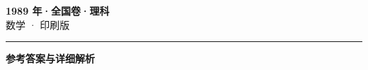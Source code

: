 \documentclass[zihao=5, a4paper]{ctexart}
\begin{document}
\begin{center}
  {\Large\bfseries 1989 年·全国卷·理科}\\[4pt]
  {\large 数学 · 印刷版}
\end{center}
\medskip
{}

\par\bigskip\hrule\bigskip
{}
\begin{center}{\large\bfseries 参考答案与详细解析}\end{center}
\smallskip

\end{document}

